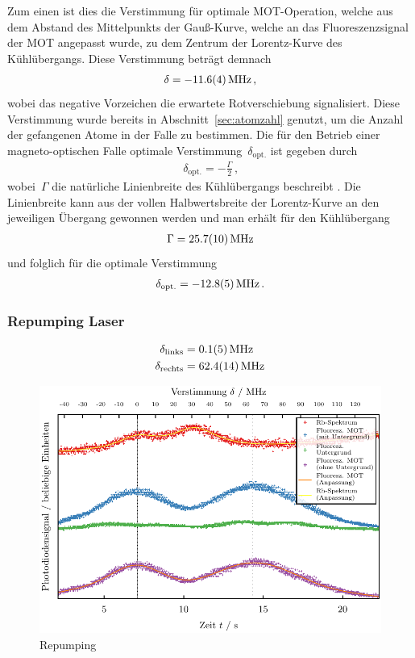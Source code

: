 \documentclass[11pt, a4paper]{article}
\numberwithin{equation}{section}
\begin{document}
Zum einen ist dies die Verstimmung für optimale MOT-Operation, welche aus dem Abstand des Mittelpunkts der Gauß-Kurve, welche an das Fluoreszenzsignal der MOT angepasst wurde, zu dem Zentrum der Lorentz-Kurve des Kühlübergangs.
Diese Verstimmung beträgt demnach
\begin{align*}
	\delta = \SI{-11.6 +- 0.4}{MHz} \, \text{,}
\end{align*}
wobei das negative Vorzeichen die erwartete Rotverschiebung signalisiert.
Diese Verstimmung wurde bereits in Abschnitt~\ref{sec:atomzahl} genutzt, um die Anzahl der gefangenen Atome in der Falle zu bestimmen.
Die für den Betrieb einer magneto-optischen Falle optimale Verstimmung~$\delta_\mathrm{opt.}$ ist gegeben durch
\begin{align*}
	\delta_\mathrm{opt.} = -\frac{\Gamma}{2} \, \text{,}
\end{align*}
wobei~$\Gamma$ die natürliche Linienbreite des Kühlübergangs beschreibt \cite{foot}.
Die Linienbreite kann aus der vollen Halbwertsbreite der Lorentz-Kurve an den jeweiligen Übergang gewonnen werden und man erhält für den Kühlübergang
\begin{align*}
	\Gamma = \SI{25.7 +- 1.0}{MHz}
\end{align*}
und folglich für die optimale Verstimmung
\begin{align*}
	\delta_\mathrm{opt.} = \SI{-12.8 +- 0.5}{MHz} \, \text{.}
\end{align*}

\subsubsection{Repumping Laser}
\begin{align*}
	\delta_\mathrm{links} &= \SI{0.1 +- 0.5}{MHz}\\
	\delta_\mathrm{rechts} &= \SI{62.4 +- 1.4}{MHz}
\end{align*}
\begin{figure}
	\includegraphics{./figures/detuning_repumping.pdf}
	\caption{Repumping}
\end{figure}
\end{document}
